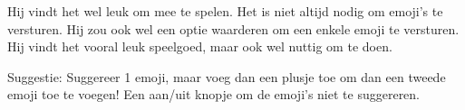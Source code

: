 \documentclass[12pt]{article}
\begin{document}
Hij vindt het wel leuk om mee te spelen.
Het is niet altijd nodig om emoji's te versturen.
Hij zou ook wel een optie waarderen om een enkele emoji te versturen.
Hij vindt het vooral leuk speelgoed, maar ook wel nuttig om te doen. 

Suggestie:
Suggereer 1 emoji, maar voeg dan een plusje toe om dan een tweede emoji toe te voegen!
Een aan/uit knopje om de emoji's niet te suggereren.







\end{document}
